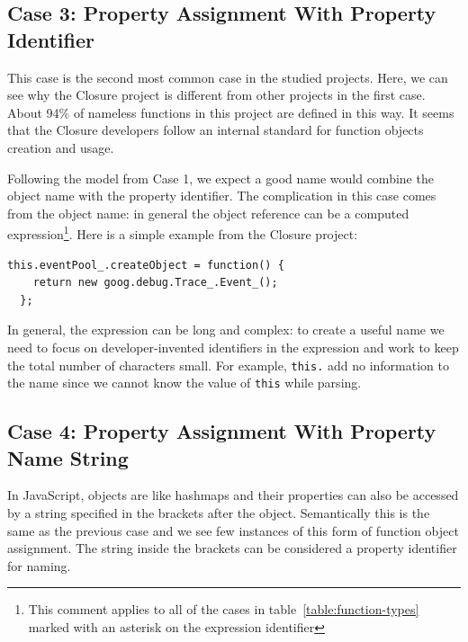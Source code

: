 \documentclass[10pt, preprint]{sigplanconf}
\begin{document}
\subsection{Case 3: Property Assignment With Property Identifier}
\label{sec:propid}
This case is the second most common case in the studied projects. Here, we can see why the Closure project is different from other projects in the first case. About 94\% of nameless functions in this project are defined in this way. It seems that the Closure developers follow an internal standard for function objects creation and usage.  

Following the model from Case 1, we expect a good name would combine the object name with the property identifier. The complication in this case comes from the object name: in general the object reference can be a computed expression\footnote[4]{This comment applies to all of the cases in table~\ref{table:function-types} marked with an asterisk on the expression identifier}. Here is a simple example from the Closure project: 
\lstset{basicstyle=\scriptsize}
\begin{lstlisting}[frame=single, language=myLang]
  this.eventPool_.createObject = function() {
    return new goog.debug.Trace_.Event_();
  };
\end{lstlisting}

In general, the expression can be long and complex: to create a useful name we need to focus on developer-invented identifiers in the expression and work to keep the total number of characters small. For example, \verb|this.| add no information to the name since we cannot know the value of \verb|this| while parsing. 

\subsection{Case 4: Property Assignment With  Property Name String}
In JavaScript, objects are like hashmaps and their properties can also be accessed by a string  specified in the brackets after the object. Semantically this is the same as the previous case and we see few instances of this form of function object assignment. The string inside the brackets can be considered a property identifier for naming.
\end{document}
